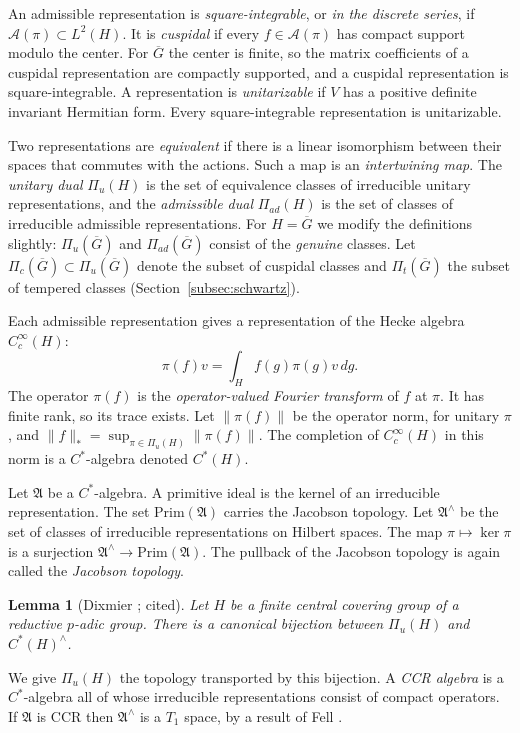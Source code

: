 \documentclass[12pt,letterpaper]{article}
\numberwithin{equation}{section}
\newtheorem{lemma}[theorem]{Lemma}
\theoremstyle{definition}
\newcommand{\cited}{cited}
\newcommand{\bG}{\overline{G}}
\newcommand{\Pia}{\Pi_{ad}(\bG)}
\newcommand{\Piu}{\Pi_{u}(\bG)}
\newcommand{\Pit}{\Pi_{t}(\bG)}
\begin{document}
An admissible representation is \emph{square-integrable}, or \emph{in the discrete
series}, if $\mathcal A(\pi)\subset L^2(H)$.  It is \emph{cuspidal} if every
$f\in\mathcal A(\pi)$ has compact support modulo the center.  For $\bG$ the center is finite,
so the matrix coefficients of a cuspidal representation are compactly supported, and a
cuspidal representation is square-integrable.  A representation is \emph{unitarizable} if
$V$ has a positive definite invariant Hermitian form.  Every square-integrable
representation is unitarizable.

Two representations are \emph{equivalent} if there is a linear isomorphism between their
spaces that commutes with the actions.  Such a map is an \emph{intertwining map}.  The
\emph{unitary dual} $\Pi_u(H)$ is the set of equivalence classes of irreducible unitary
representations, and the \emph{admissible dual} $\Pi_{ad}(H)$ is the set of classes of
irreducible admissible representations.  For $H=\bG$ we modify the definitions slightly:
$\Piu$ and $\Pia$ consist of the \emph{genuine} classes.  Let $\Pi_c(\bG)\subset\Piu$ denote
the subset of cuspidal classes and $\Pit$ the subset of tempered classes
(Section~\ref{subsec:schwartz}).

Each admissible representation gives a representation of the Hecke algebra
$C_c^\infty(H)$:
\[
\pi(f)v=\int_Hf(g)\pi(g)v\,dg .
\]
The operator $\pi(f)$ is the \emph{operator-valued Fourier transform} of $f$ at $\pi$.  It
has finite rank, so its trace exists.  Let $\|\pi(f)\|$ be the operator norm, for unitary
$\pi$, and $\|f\|_*=\sup_{\pi\in\Pi_u(H)}\|\pi(f)\|$.  The completion of $C_c^\infty(H)$ in
this norm is a $C^*$-algebra denoted $C^*(H)$.

Let $\mathfrak A$ be a $C^*$-algebra.  A primitive ideal is the kernel of an irreducible
representation.  The set $\mathrm{Prim}(\mathfrak A)$ carries the Jacobson topology.  Let
$\mathfrak A^\wedge$ be the set of classes of irreducible representations on Hilbert
spaces.  The map $\pi\mapsto\ker\pi$ is a surjection
$\mathfrak A^\wedge\to\mathrm{Prim}(\mathfrak A)$.  The pullback of the Jacobson topology
is again called the \emph{Jacobson topology}.

\begin{lemma}[Dixmier \cite{Di77}; \cited]\label{lem:dixmier}
Let $H$ be a finite central covering group of a reductive $p$-adic group.  There is a
canonical bijection between $\Pi_u(H)$ and $C^*(H)^\wedge$.
\end{lemma}

We give $\Pi_u(H)$ the topology transported by this bijection.  A \emph{CCR algebra} is a
$C^*$-algebra all of whose irreducible representations consist of compact operators.  If
$\mathfrak A$ is CCR then $\mathfrak A^\wedge$ is a $T_1$ space, by a result of Fell
\cite{Fe60}.
\end{document}
